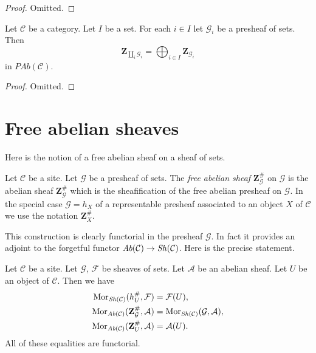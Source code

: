 \begin{proof}
Omitted.
\end{proof}

\begin{lemma}
\label{lemma-coproduct-sum-free-abelian-presheaf}
Let $\mathcal{C}$ be a category.
Let $I$ be a set. For each $i \in I$ let
$\mathcal{G}_i$ be a presheaf of sets.
Then
$$
\mathbf{Z}_{\coprod_i \mathcal{G}_i}
=
\bigoplus\nolimits_{i \in I} \mathbf{Z}_{\mathcal{G}_i}
$$
in $\textit{PAb}(\mathcal{C})$.
\end{lemma}

\begin{proof}
Omitted.
\end{proof}



\section{Free abelian sheaves}
\label{section-free-abelian-sheaf}

\noindent
Here is the notion of a free abelian sheaf on a sheaf of sets.

\begin{definition}
\label{definition-free-abelian-sheaf-on}
Let $\mathcal{C}$ be a site. Let $\mathcal{G}$ be a presheaf of sets.
The {\it free abelian sheaf} $\mathbf{Z}_\mathcal{G}^\#$
on $\mathcal{G}$ is the abelian sheaf $\mathbf{Z}_\mathcal{G}^\#$
which is the sheafification of the free abelian presheaf on $\mathcal{G}$.
In the special case $\mathcal{G} = h_X$ of a representable presheaf
associated to an object $X$ of $\mathcal{C}$
we use the notation $\mathbf{Z}_X^\#$.
\end{definition}

\noindent
This construction is clearly functorial in the presheaf $\mathcal{G}$.
In fact it provides an adjoint to the forgetful functor
$\textit{Ab}(\mathcal{C}) \to \mathop{\mathit{Sh}}\nolimits(\mathcal{C})$.
Here is the precise statement.

\begin{lemma}
\label{lemma-obvious-adjointness-sheaves}
Let $\mathcal{C}$ be a site.
Let $\mathcal{G}$, $\mathcal{F}$ be sheaves of sets.
Let $\mathcal{A}$ be an abelian sheaf.
Let $U$ be an object of $\mathcal{C}$. Then
we have
\begin{align*}
\mathop{\mathrm{Mor}}\nolimits_{\mathop{\mathit{Sh}}\nolimits(\mathcal{C})}(h_U^\#, \mathcal{F})
& =
\mathcal{F}(U), \\
\mathop{\mathrm{Mor}}\nolimits_{\textit{Ab}(\mathcal{C})}(\mathbf{Z}_\mathcal{G}^\#,
\mathcal{A})
& =
\mathop{\mathrm{Mor}}\nolimits_{\mathop{\mathit{Sh}}\nolimits(\mathcal{C})}(\mathcal{G}, \mathcal{A}), \\
\mathop{\mathrm{Mor}}\nolimits_{\textit{Ab}(\mathcal{C})}(\mathbf{Z}_U^\#, \mathcal{A})
& =
\mathcal{A}(U).
\end{align*}
All of these equalities are functorial.
\end{lemma}

